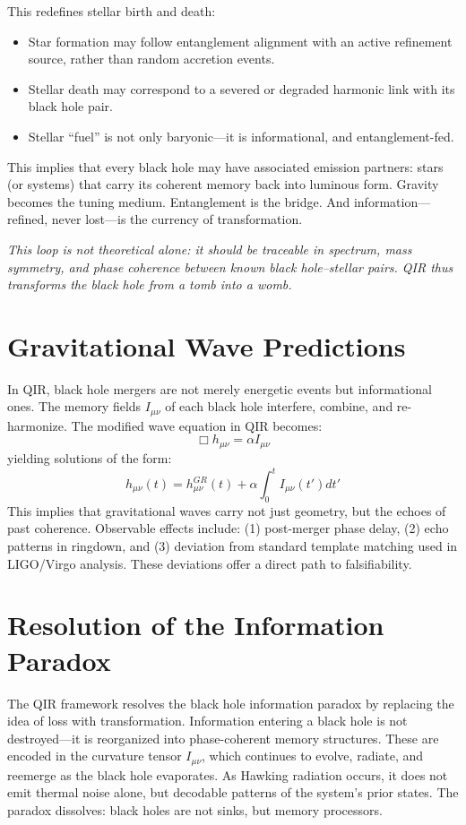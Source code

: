 \documentclass[11pt]{article}
\begin{document}
This redefines stellar birth and death:

\begin{itemize}
  \item Star formation may follow entanglement alignment with an active refinement source, rather than random accretion events.
  \item Stellar death may correspond to a severed or degraded harmonic link with its black hole pair.
  \item Stellar “fuel” is not only baryonic—it is informational, and entanglement-fed.
\end{itemize}

This implies that every black hole may have associated emission partners: stars (or systems) that carry its coherent memory back into luminous form. Gravity becomes the tuning medium. Entanglement is the bridge. And information—refined, never lost—is the currency of transformation.

\textit{This loop is not theoretical alone: it should be traceable in spectrum, mass symmetry, and phase coherence between known black hole–stellar pairs. QIR thus transforms the black hole from a tomb into a womb.}

\section{Gravitational Wave Predictions}

In QIR, black hole mergers are not merely energetic events but informational ones. The memory fields \( I_{\mu\nu} \) of each black hole interfere, combine, and re-harmonize. The modified wave equation in QIR becomes:
\[
\Box h_{\mu\nu} = \alpha I_{\mu\nu}
\]
yielding solutions of the form:
\[
h_{\mu\nu}(t) = h^{GR}_{\mu\nu}(t) + \alpha \int_0^t I_{\mu\nu}(t') dt'
\]
This implies that gravitational waves carry not just geometry, but the echoes of past coherence. Observable effects include: (1) post-merger phase delay, (2) echo patterns in ringdown, and (3) deviation from standard template matching used in LIGO/Virgo analysis. These deviations offer a direct path to falsifiability.

\section{Resolution of the Information Paradox}

The QIR framework resolves the black hole information paradox by replacing the idea of loss with transformation. Information entering a black hole is not destroyed—it is reorganized into phase-coherent memory structures. These are encoded in the curvature tensor \( I_{\mu\nu} \), which continues to evolve, radiate, and reemerge as the black hole evaporates. As Hawking radiation occurs, it does not emit thermal noise alone, but decodable patterns of the system’s prior states. The paradox dissolves: black holes are not sinks, but memory processors.
\end{document}

